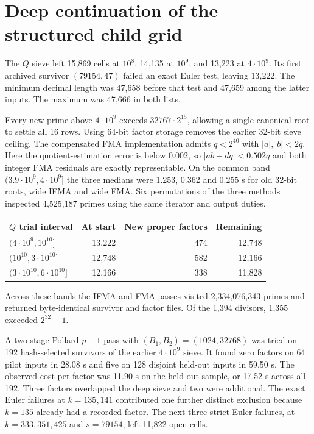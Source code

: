 \documentclass[11pt,a4paper,oneside,openany]{report}
\begin{document}
\section{Deep continuation of the structured child grid}
The $Q$ sieve left 15,869 cells at $10^8$, 14,135 at $10^9$, and 13,223 at $4\cdot10^9$. Its first archived survivor $(79154,47)$ failed an exact Euler test, leaving 13,222. The minimum decimal length was 47,658 before that test and 47,659 among the latter inputs. The maximum was 47,666 in both lists.

Every new prime above $4\cdot10^9$ exceeds $32767\cdot2^{15}$, allowing a single canonical root to settle all 16 rows. Using 64-bit factor storage removes the earlier 32-bit sieve ceiling. The compensated FMA implementation admits $q<2^{40}$ with $|a|,|b|<2q$. Here the quotient-estimation error is below $0.002$, so $|ab-dq|<0.502q$ and both integer FMA residuals are exactly representable. On the common band $(3.9\cdot10^9,4\cdot10^9]$ the three medians were 1.253, 0.362 and 0.255 s for old 32-bit roots, wide IFMA and wide FMA. Six permutations of the three methods inspected 4,525,187 primes using the same iterator and output duties.

\begin{center}\small
\begin{tabular}{@{}lrrr@{}}\toprule
$Q$ trial interval & At start & New proper factors & Remaining\\\midrule
$(4\cdot10^9,10^{10}]$ &13,222&474&12,748\\
$(10^{10},3\cdot10^{10}]$ &12,748&582&12,166\\
$(3\cdot10^{10},6\cdot10^{10}]$ &12,166&338&11,828\\\bottomrule
\end{tabular}
\end{center}
Across these bands the IFMA and FMA passes visited 2,334,076,343 primes and returned byte-identical survivor and factor files. Of the 1,394 divisors, 1,355 exceeded $2^{32}-1$.

A two-stage Pollard $p-1$ pass with $(B_1,B_2)=(1024,32768)$ was tried on 192 hash-selected survivors of the earlier $4\cdot10^9$ sieve. It found zero factors on 64 pilot inputs in 28.08 s and five on 128 disjoint held-out inputs in 59.50 s. The observed cost per factor was 11.90 s on the held-out sample, or 17.52 s across all 192. Three factors overlapped the deep sieve and two were additional. The exact Euler failures at $k=135,141$ contributed one further distinct exclusion because $k=135$ already had a recorded factor. The next three strict Euler failures, at $k=333,351,425$ and $s=79154$, left 11,822 open cells.
\end{document}
